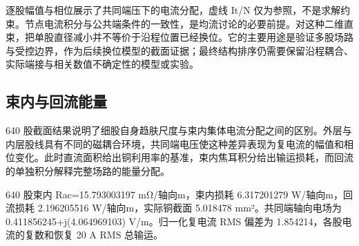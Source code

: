 \documentclass[journal,10pt]{IEEEtran}
\begin{document}
逐股幅值与相位展示了共同端压下的电流分配，虚线 It/N 仅为参照，不是求解约束。节点电流积分与公共端条件的一致性，是均流讨论的必要前提。对这种二维直束，把单股直径减小并不等价于沿程位置已经换位。它的主要用途是验证多股场路与受控边界，作为后续换位模型的截面证据；最终结构排序仍需要保留沿程耦合、实际端接与相关数值不确定性的模型或实验。


\subsection*{束内与回流能量}
\hypertarget{04.interpretation.heading}{}
640 股截面结果说明了细股自身趋肤尺度与束内集体电流分配之间的区别。外层与内层股线具有不同的磁耦合环境，共同端电压使这种差异表现为复电流的幅值和相位变化。此时直流面积给出铜利用率的基准，束内焦耳积分给出输运损耗，而回流的单独积分解释完整场路的能量分配。


640 股束内 Rac=15.793003197 mΩ/轴向m，束内损耗 6.317201279 W/轴向m，回流损耗 2.196205516 W/轴向m，实际铜截面 5.018478 mm²。共同端轴向电场为 0.411856245+j(4.064969103) V/m。归一化复电流 RMS 偏差为 1.854214，各股电流的复数和恢复 20 A RMS 总输运。
\end{document}
